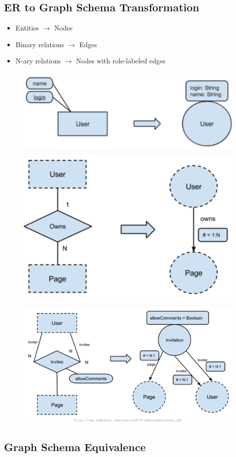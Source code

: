 \documentclass{article}
\begin{document}
\subsection*{ER to Graph Schema Transformation}
\begin{itemize}
  \item Entities \(\to\) Nodes
  \item Binary relations \(\to\) Edges
  \item N-ary relations \(\to\) Nodes with role-labeled edges
\end{itemize}

\begin{figure}[H]
    \includegraphics[width=0.4\linewidth]{images/1.png}
\end{figure}
    
\begin{figure}[H]
    \includegraphics[width=0.4\linewidth]{images/2.png}
\end{figure}

\begin{figure}[H]
    \includegraphics[width=0.4\linewidth]{images/3.png}
\end{figure}

\subsection*{Graph Schema Equivalence}

\end{document}

